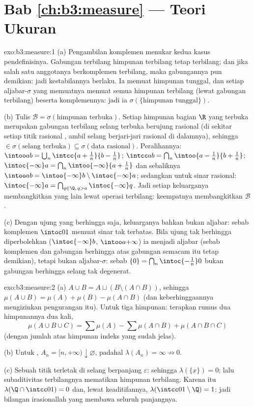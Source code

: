 \section*{Bab \ref{ch:b3:measure} --- Teori Ukuran}

\begin{solution}{exo:b3:measure:1}
(a) Pengambilan komplemen menukar kedua kasus pendefinisinya. Gabungan
terbilang himpunan terbilang tetap terbilang; dan jika salah satu anggotanya
berkomplemen terbilang, maka gabungannya pun demikian: jadi kestabilannya berlaku. Ia
memuat himpunan tunggal, dan setiap aljabar-$\sigma$ yang memuatnya
memuat semua himpunan terbilang (lewat gabungan terbilang) beserta
komplemennya: jadi ia $\sigma(\{\text{himpunan tunggal}\})$.

(b) Tulis $\mathcal B = \sigma(\text{himpunan terbuka})$. Setiap himpunan bagian
$\R$ yang terbuka merupakan gabungan terbilang selang terbuka
berujung rasional (di sekitar setiap titik rasional ,
ambil selang berjari-jari rasional di dalamnya), sehingga  $\in
\sigma(\text{selang terbuka}) \subseteq \sigma(\text{data
rasional})$. Peralihannya: $\intoo ab = \bigcup_n\intcc{a +
\frac1n}{b - \frac1n}$; $\intcc ab = \bigcap_n \intoo{a -
\frac1n}{b + \frac1n}$; $\intoc{-\infty}a = \bigcap_n
\intoo{-\infty}{a + \frac1n}$ dan sebaliknya $\intoo ab =
\intoo{-\infty}b \setminus \intoc{-\infty}a$; sedangkan untuk sinar rasional:
$\intoc{-\infty}a =
\bigcap_{q \in \Q,\, q > a}\intoc{-\infty}q$. Jadi setiap keluarganya
membangkitkan yang lain lewat operasi terbilang: keempatnya membangkitkan
$\mathcal B$.

(c) Dengan ujung yang berhingga saja, keluarganya bahkan bukan
aljabar: sebab komplemen $\intoc01$ memuat sinar tak terbatas.
Bila ujung tak berhingga diperbolehkan ($\intoc{-\infty}b$, $\intoo
a{+\infty}$) ia menjadi aljabar (sebab komplemen dan gabungan
berhingga atas gabungan semacam itu tetap demikian), tetapi bukan aljabar-$\sigma$:
sebab $\{0\} = \bigcap_n\intoc{-\frac1n}0$ bukan gabungan berhingga
selang tak degenerat.
\end{solution}

\begin{solution}{exo:b3:measure:2}
(a) $A \cup B = A \sqcup (B \setminus (A\cap B))$, sehingga
$\mu(A\cup B) = \mu(A) + \mu(B) - \mu(A\cap B)$ (dan keberhinggaannya
mengizinkan pengurangan itu). Untuk tiga himpunan: terapkan rumus dua himpunannya
dua kali,
\[
\mu(A\cup B\cup C) = \sum\mu(A) - \sum\mu(A\cap B) +
\mu(A\cap B\cap C)
\]
(dengan jumlah atas himpunan indeks yang sudah jelas).

(b) Untuk , $A_n = [n, +\infty) \downarrow
\varnothing$, padahal $\lambda(A_n) = \infty \not\to 0$.

(c) Sebuah titik terletak di selang berpanjang $\varepsilon$:
sehingga $\lambda(\{x\}) = 0$; lalu subaditivitas terbilangnya mematikan himpunan
terbilang. Karena itu $\lambda(\Q \cap \intcc01) = 0$ dan, lewat keaditifannya,
$\lambda(\intcc01\setminus\Q) = 1$: jadi bilangan irasionallah yang membawa seluruh
panjangnya.
\end{solution}

